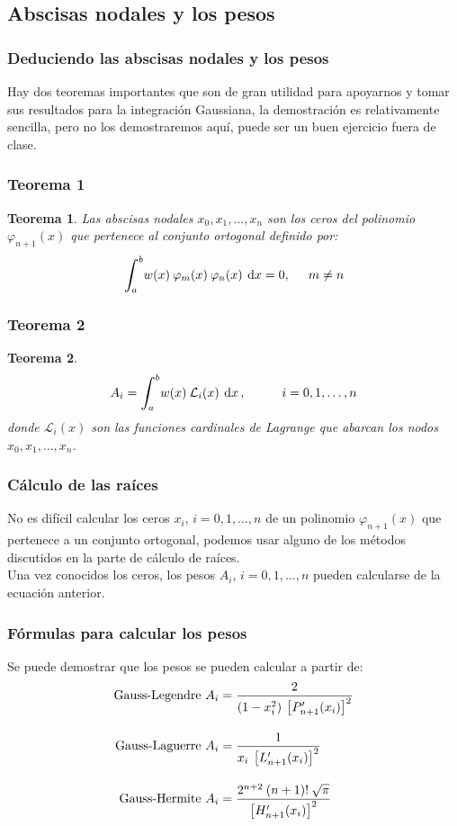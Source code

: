 \documentclass[12pt]{beamer}
\newtheorem{miteorema}{Teorema}
\begin{document}
\subsection{Abscisas nodales y los pesos}

\begin{frame}
\frametitle{Deduciendo las abscisas nodales y los pesos}
Hay dos teoremas importantes que son de gran utilidad para apoyarnos y tomar sus resultados para la integración Gaussiana, la demostración es relativamente sencilla, pero no los demostraremos aquí, puede ser un buen ejercicio fuera de clase.
\end{frame}
\begin{frame}
\frametitle{Teorema 1}
\begin{miteorema}
Las abscisas nodales $x_{0}, x_{1}, \ldots, x_{n}$ son los ceros del polinomio $\varphi_{n+1} (x)$  que pertenece al conjunto ortogonal definido por:
\begin{align*}
\scaleint{6ex}_{\bs a}^{b} w (x) \: \varphi_{m} (x) \: \varphi_{n} (x) \: \dd{x} = 0, \hspace{0.5cm} m \neq n
\end{align*}
\end{miteorema}
\end{frame}
\begin{frame}
\frametitle{Teorema 2}
\begin{miteorema}
\begin{align*}
A_{i} = \scaleint{6ex}_{\bs a}^{b} w (x) \: \mathcal{L}_{i} (x) \: \dd{x}, \hspace{1cm} i = 0, 1, \ldots, n
\end{align*}
donde $\mathcal{L}_{i} (x)$ son las funciones cardinales de Lagrange que abarcan los nodos $x_{0}, x_{1}, \ldots, x_{n}$.
\end{miteorema}
\end{frame}
\begin{frame}
\frametitle{Cálculo de las raíces}
No es difícil calcular los ceros $x_{i}$, $i = 0, 1, \ldots, n$ de un polinomio $\varphi_{n + 1} (x)$ que pertenece a un conjunto ortogonal, podemos usar alguno de los métodos discutidos en la parte de cálculo de raíces.
\\
\bigskip
\pause
Una vez conocidos los ceros, los pesos $A_{i}$, $i = 0, 1, \ldots, n$ pueden calcularse de la ecuación anterior.
\end{frame}
\begin{frame}
\frametitle{Fórmulas para calcular los pesos}
Se puede demostrar que los pesos se pueden calcular a partir de:
\pause
\begin{align*}
\text{Gauss-Legendre   }  A_{i} &= \dfrac{2}{(1 - x^{2}_{i}) \: \left[{P}^{\prime}_{n + 1} (x_{i}) \right]^{2}} \\[1em]
\text{Gauss-Laguerre   } A_{i} &= \dfrac{1}{x_{i} \: \left[{L}^{\prime}_{n + 1} (x_{i}) \right]^{2}} \\[1em]
\text{Gauss-Hermite   } A_{i} &= \dfrac{2^{n + 2} \: (n + 1)! \: \sqrt{\pi}}{\left[ {H}^{\prime}_{n + 1} (x_{i}) \right]^{2}}
\end{align*}
\end{frame}
\end{document}
